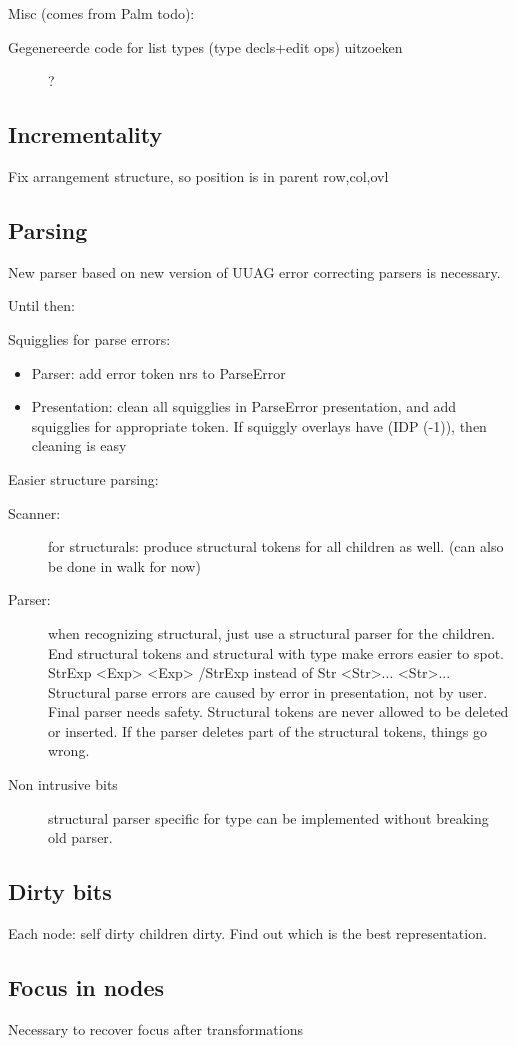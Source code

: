 \documentclass[]{article}
\begin{document}
Misc (comes from Palm todo):
\begin{description}
\item [Gegenereerde code for list types (type decls+edit ops) uitzoeken] ?
\end{description}


\subsection{Incrementality}
Fix arrangement structure, so position is in parent row,col,ovl

\subsection{Parsing}
New parser based on new version of UUAG error correcting parsers is necessary.

Until then:

Squigglies for parse errors:
\begin{itemize}
\item Parser: add error token nrs to ParseError
\item Presentation: clean all squigglies in ParseError presentation, and add squigglies for appropriate token. If squiggly overlays have (IDP (-1)), then cleaning is easy
\end{itemize}

Easier structure parsing:
\begin{description}
\item[Scanner:] for structurals: produce structural tokens for all children as well. (can also be done in walk for now)
\item[Parser:] when recognizing structural, just use a structural parser for the children. End structural tokens and structural with type make errors easier to spot. StrExp <Exp> <Exp> /StrExp instead of Str <Str>... <Str>... Structural parse errors are caused by error in presentation, not by user. Final parser needs safety. Structural tokens are never allowed to be deleted or inserted. If the parser deletes part of the structural tokens, things go wrong.
\item[Non intrusive bits] structural parser specific for type can be implemented without breaking old parser.
\end{description}

\subsection{Dirty bits}
Each node: self dirty children dirty. Find out which is the best representation.

\subsection{Focus in nodes}
Necessary to recover focus after transformations
\end{document}
